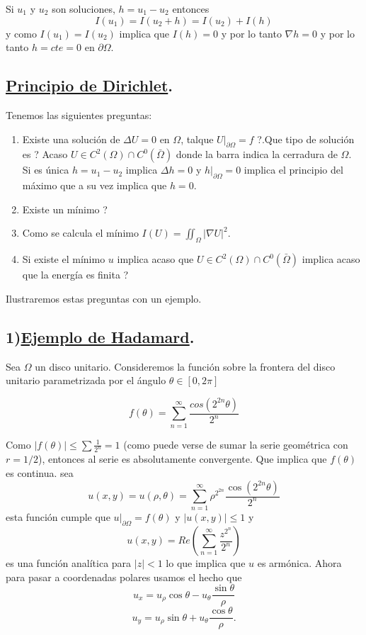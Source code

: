 \documentclass[a4paper,10pt]{book}
\begin{document}
Si $u_1$ y $u_2$ son soluciones, $h=u_1-u_2$ entonces
\[I(u_1)=I(u_2+h)=I(u_2)+I(h)\]
y como $I(u_1)=I(u_2)$ implica que $I(h)=0$ y por lo tanto $\nabla h=0$ y por lo tanto 
$h=cte=0$ en $\partial \Omega$.

\subsection*{\underline{Principio de Dirichlet}.}
Tenemos las siguientes preguntas:
\begin{enumerate}
 \item \textquestiondown Existe una soluci\'on de $\Delta U=0$ 
en $\Omega$, talque $U|_{\partial \Omega}=f$ ?.\textquestiondown Que tipo de solución es ?
Acaso $U\in C^2 (\Omega) \cap C^0 (\bar{\Omega})$ donde la barra indica la cerradura de $\Omega$.
Si es \'unica  $h=u_1-u_2$ implica $\Delta h=0$ y $h|_{\partial \Omega} =0$ implica el principio
del m\'aximo que a su vez implica que $h=0$.

\item \textquestiondown Existe un m\'inimo ?
\item \textquestiondown Como se calcula el m\'inimo $I(U)=\iint_{\Omega}  |\nabla U|^2 $.
\item Si existe el m\'inimo $u$ implica acaso que $U\in C^2 (\Omega) \cap C^0 (\bar{\Omega})$ implica 
acaso que la energ\'ia es finita ?
\end{enumerate}

Ilustraremos estas preguntas con un ejemplo. 

\subsection*{1)\underline{Ejemplo de Hadamard}.}

Sea $\Omega $ un disco unitario. Consideremos la funci\'on sobre la frontera del 
disco unitario parametrizada por el \'angulo $\theta\in [0,2\pi]$

\begin{equation}
\label{hadamard}
  f(\theta)=\sum\limits_{n=1}^{\infty} \frac{cos(2^{2n} \theta)}{2^n}
\end{equation}

Como $|f(\theta)|\leq \sum\limits \frac{1}{2^n} =1$ (como puede verse de sumar la serie geom\'etrica con $r=1/2$),
entonces al serie es absolutamente convergente. Que implica que $f(\theta)$ es continua.
sea 
\[u(x,y)=u(\rho,\theta)=\sum\limits_{n=1}^{\infty}  \rho ^{2 ^{2n} } \frac{\cos(2^{2n} \theta)}{2^n}\]
esta funci\'on cumple que $u|_{\partial \Omega}=f(\theta)$  y $|u(x,y)|\leq 1$ y
\[u(x,y)= Re \left( \sum\limits_{n=1}^\infty \frac{z^{2^{n}} }{2^n}\right) \]
es una funci\'on anal\'itica para $|z|<1$  lo que implica que $u$ es arm\'onica. Ahora para pasar a coordenadas
polares usamos el hecho que 
\[u_x=u_\rho \cos \theta - u_{\theta} \frac{\sin \theta}{\rho} \]
\[u_y=u_\rho \sin \theta  + u_{\theta} \frac{\cos \theta}{\rho}.\]
\end{document}
